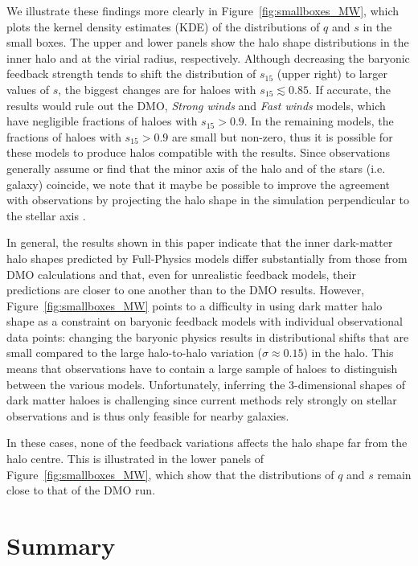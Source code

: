 \documentclass[fleqn,usenatbib]{mnras}
\begin{document}
We illustrate these findings more clearly in Figure~\ref{fig:smallboxes_MW}, which plots the kernel density estimates (KDE) of the distributions of $q$ and $s$ in the small boxes.
The upper and lower panels show the halo shape distributions in the inner halo and at the virial radius, respectively.
Although decreasing the baryonic feedback strength tends to shift the distribution of $s_{15}$ (upper right) to larger values of $s$, the biggest changes are for haloes with $s_{15} \lesssim 0.85$. 
If accurate, the \cite{Bovy16v833} results would rule out the DMO, \emph{Strong winds} and \emph{Fast winds} models, which have negligible fractions of haloes with $s_{15} > 0.9$.
In the remaining models, the fractions of haloes with $s_{15} > 0.9$ are small but non-zero, thus it is possible for these models to produce halos compatible with the \cite{Bovy16v833} results.
Since observations generally assume or find that the minor axis of the halo and of the stars (i.e. galaxy) coincide, we note that it maybe be possible to improve the agreement with observations by projecting the halo shape in the simulation perpendicular to the stellar axis \citep{Chua19v484}.

In general, the results shown in this paper indicate that the inner dark-matter halo shapes predicted by Full-Physics models differ substantially from those from DMO calculations and that, even for unrealistic feedback models, their predictions are closer to one another than to the DMO results. However, Figure~\ref{fig:smallboxes_MW} points to a difficulty in using dark matter halo shape as a constraint on baryonic feedback models with individual observational data points:
changing the baryonic physics results in distributional shifts that are small compared to the large halo-to-halo variation ($\sigma \approx 0.15$) in the halo.
This means that observations have to contain a large sample of haloes to distinguish between the various models.
Unfortunately, inferring the 3-dimensional shapes of dark matter haloes is challenging since current methods rely strongly on stellar observations and is thus only feasible for nearby galaxies.

In these cases, none of the feedback variations affects the halo shape far from the halo centre.
This is illustrated in the lower panels of Figure~\ref{fig:smallboxes_MW}, which show that the distributions of $q$ and $s$ remain close to that of the DMO run.




\section{Summary}
\label{sec:conclusions}
\end{document}
